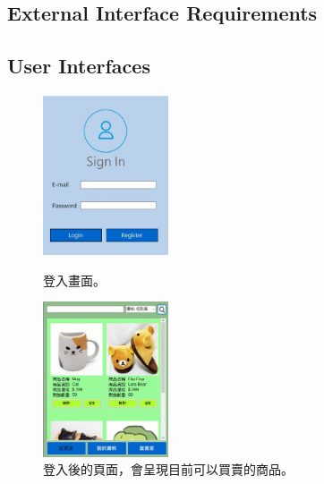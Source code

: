 \documentclass{scrreprt}
\begin{document}
\begin{CJK}{UTF8}{bkai}
\chapter{External Interface Requirements}

\section{User Interfaces}
\begin{figure}[h]
	\centering
	\includegraphics[width=0.33\textwidth]{signin.jpg}
	\caption{登入畫面。}
	\centering
	\includegraphics[width=0.33\textwidth]{search.jpg}
	\caption{登入後的頁面，會呈現目前可以買賣的商品。}
\end{figure}


\end{CJK}
\end{document}
